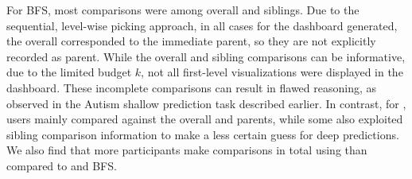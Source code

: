 \par For BFS, most comparisons were among overall and siblings. Due to the sequential, level-wise picking approach, in all cases for the \BFS dashboard generated, the overall corresponded to the immediate parent, so they are not explicitly recorded as parent. While the overall and sibling comparisons can be informative, due to the limited budget $k$, not all first-level visualizations were displayed in the dashboard. These incomplete comparisons can result in flawed reasoning, as observed in the Autism shallow prediction task described earlier. In contrast, for \system, users mainly compared against the overall and parents, while some also exploited sibling comparison information to make a less certain guess for deep predictions. We also find that more participants make comparisons in total using \system than compared to \cluster and BFS.

